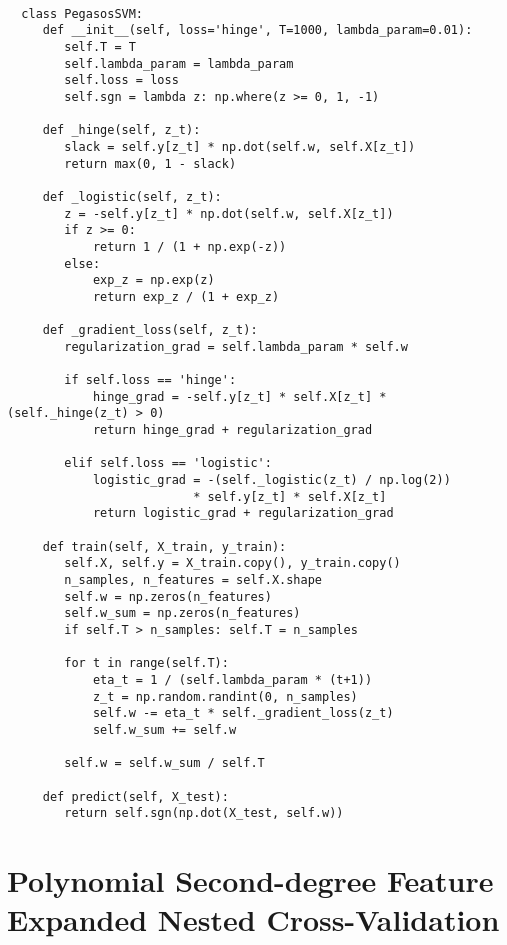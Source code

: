 \begin{verbatim}

  class PegasosSVM:
     def __init__(self, loss='hinge', T=1000, lambda_param=0.01):
        self.T = T
        self.lambda_param = lambda_param
        self.loss = loss
        self.sgn = lambda z: np.where(z >= 0, 1, -1)

     def _hinge(self, z_t):
        slack = self.y[z_t] * np.dot(self.w, self.X[z_t])
        return max(0, 1 - slack)

     def _logistic(self, z_t):
        z = -self.y[z_t] * np.dot(self.w, self.X[z_t])
        if z >= 0:
            return 1 / (1 + np.exp(-z))
        else:
            exp_z = np.exp(z)
            return exp_z / (1 + exp_z)

     def _gradient_loss(self, z_t):
        regularization_grad = self.lambda_param * self.w

        if self.loss == 'hinge':
            hinge_grad = -self.y[z_t] * self.X[z_t] * (self._hinge(z_t) > 0)
            return hinge_grad + regularization_grad

        elif self.loss == 'logistic':
            logistic_grad = -(self._logistic(z_t) / np.log(2))
                          * self.y[z_t] * self.X[z_t]
            return logistic_grad + regularization_grad

     def train(self, X_train, y_train):
        self.X, self.y = X_train.copy(), y_train.copy()
        n_samples, n_features = self.X.shape
        self.w = np.zeros(n_features)
        self.w_sum = np.zeros(n_features)
        if self.T > n_samples: self.T = n_samples

        for t in range(self.T):
            eta_t = 1 / (self.lambda_param * (t+1))
            z_t = np.random.randint(0, n_samples)
            self.w -= eta_t * self._gradient_loss(z_t)
            self.w_sum += self.w

        self.w = self.w_sum / self.T

     def predict(self, X_test):
        return self.sgn(np.dot(X_test, self.w))

\end{verbatim}


\section{Polynomial Second-degree Feature Expanded Nested Cross-Validation}\label{appendix:feature_expansion}

